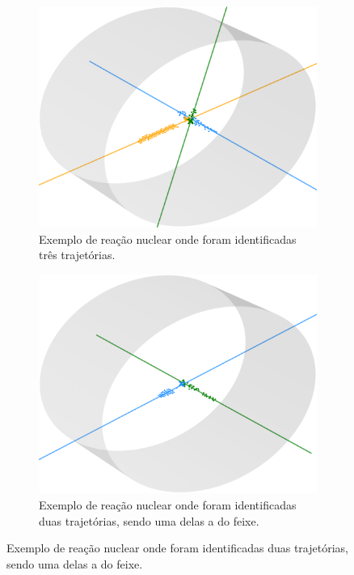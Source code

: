 \documentclass[a4paper,12pt,oneside]{book}
\begin{document}
\begin{figure}[H]
\centering
    \begin{subfigure}[b]{\textwidth}
        \centering
        \includegraphics[scale = 0.3]{figs/results_ex_3_tracks.png}
        \caption{Exemplo de reação nuclear onde foram identificadas três trajetórias.}
        \label{subfig:res_exemplo_3_tracks}
    \end{subfigure}%
    \hfill
    \begin{subfigure}[t]{0.45\textwidth}
        \centering
        \includegraphics[scale=0.4, width=.95\columnwidth]{figs/results_ex_2_tracks.png}
        \caption{Exemplo de reação nuclear onde foram identificadas duas trajetórias, sendo uma delas a do feixe.}

\end{subfigure}
\end{figure}
\end{document}
